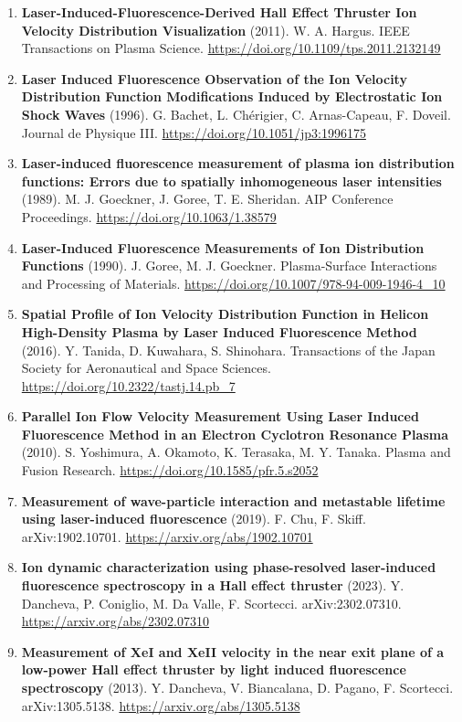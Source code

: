 \documentclass[11pt,a4paper]{article}
\begin{document}
\begin{enumerate}[leftmargin=1.4em]
\item \textbf{Laser-Induced-Fluorescence-Derived Hall Effect Thruster Ion Velocity Distribution Visualization} (2011). W. A. Hargus. IEEE Transactions on Plasma Science. \url{https://doi.org/10.1109/tps.2011.2132149}
\item \textbf{Laser Induced Fluorescence Observation of the Ion Velocity Distribution Function Modifications Induced by Electrostatic Ion Shock Waves} (1996). G. Bachet, L. Chérigier, C. Arnas-Capeau, F. Doveil. Journal de Physique III. \url{https://doi.org/10.1051/jp3:1996175}
\item \textbf{Laser-induced fluorescence measurement of plasma ion distribution functions: Errors due to spatially inhomogeneous laser intensities} (1989). M. J. Goeckner, J. Goree, T. E. Sheridan. AIP Conference Proceedings. \url{https://doi.org/10.1063/1.38579}
\item \textbf{Laser-Induced Fluorescence Measurements of Ion Distribution Functions} (1990). J. Goree, M. J. Goeckner. Plasma-Surface Interactions and Processing of Materials. \url{https://doi.org/10.1007/978-94-009-1946-4_10}
\item \textbf{Spatial Profile of Ion Velocity Distribution Function in Helicon High-Density Plasma by Laser Induced Fluorescence Method} (2016). Y. Tanida, D. Kuwahara, S. Shinohara. Transactions of the Japan Society for Aeronautical and Space Sciences. \url{https://doi.org/10.2322/tastj.14.pb_7}
\item \textbf{Parallel Ion Flow Velocity Measurement Using Laser Induced Fluorescence Method in an Electron Cyclotron Resonance Plasma} (2010). S. Yoshimura, A. Okamoto, K. Terasaka, M. Y. Tanaka. Plasma and Fusion Research. \url{https://doi.org/10.1585/pfr.5.s2052}
\item \textbf{Measurement of wave-particle interaction and metastable lifetime using laser-induced fluorescence} (2019). F. Chu, F. Skiff. arXiv:1902.10701. \url{https://arxiv.org/abs/1902.10701}
\item \textbf{Ion dynamic characterization using phase-resolved laser-induced fluorescence spectroscopy in a Hall effect thruster} (2023). Y. Dancheva, P. Coniglio, M. Da Valle, F. Scortecci. arXiv:2302.07310. \url{https://arxiv.org/abs/2302.07310}
\item \textbf{Measurement of XeI and XeII velocity in the near exit plane of a low-power Hall effect thruster by light induced fluorescence spectroscopy} (2013). Y. Dancheva, V. Biancalana, D. Pagano, F. Scortecci. arXiv:1305.5138. \url{https://arxiv.org/abs/1305.5138}

\end{enumerate}
\end{document}
